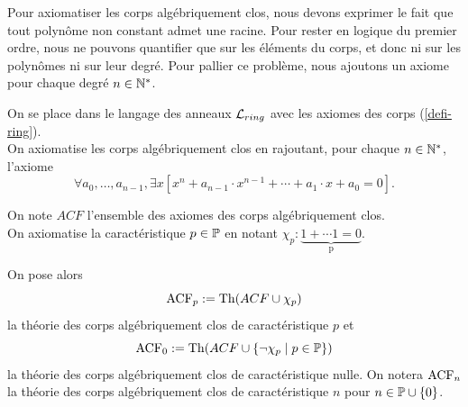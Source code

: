 Pour axiomatiser les corps algébriquement clos, nous devons exprimer le fait que tout
polynôme non constant admet une racine. Pour rester en logique du premier ordre,
nous ne pouvons quantifier que sur les éléments du corps, et donc ni sur les
polynômes ni sur leur degré. Pour pallier ce problème, nous ajoutons un axiome
pour chaque degré $n \in \mathbb{N}^{*}$.

\begin{defi}\label{defACF}
    On se place dans le langage des anneaux $\mathcal{L}_{ring}$ avec les axiomes des
    corps (\cref{defi-ring}).\\
    On axiomatise les corps algébriquement clos en rajoutant, pour
    chaque $n \in \mathbb{N}^{*}$, l'axiome \[ \forall a_0, \ldots, a_{n-1}, \exists x
    [x^n+a_{n-1}\cdot x^{n-1} + \cdots + a_1 \cdot x + a_0 = 0].\]

    On note $ACF$ l'ensemble des axiomes des corps algébriquement clos. \\

    On axiomatise la caractéristique $p \in \mathbb{P}$ en notant $\chi_p : \underbrace{1 +
    \cdots 1 = 0}_\text{p} $.

    On pose alors \[ \operatorname{ACF}_p := \operatorname{Th}(ACF \cup \chi_p) \] la théorie des corps
    algébriquement clos de caractéristique $p$ et \[ \operatorname{ACF}_0 := \operatorname{Th}(ACF \cup \{\neg
    \chi_p \mid p \in \mathbb{P}\}) \] la théorie des corps algébriquement clos de
    caractéristique nulle. On notera $\operatorname{ACF}_n$ la théorie des corps
    algébriquement clos de caractéristique $n$ pour $n \in \mathbb{P} \cup \{0\}$. 
\end{defi}

